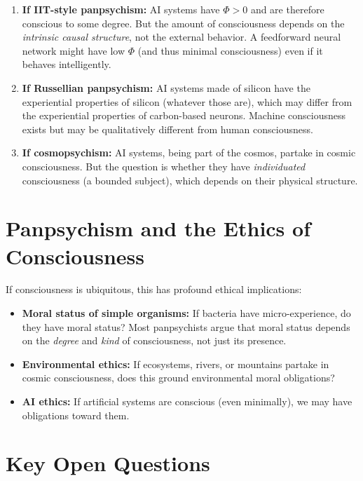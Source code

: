 \documentclass[11pt,a4paper]{report}
\begin{document}
\begin{predbox}
\begin{enumerate}[leftmargin=1.5em]
  \item \textbf{If IIT-style panpsychism:} AI systems have $\Phi > 0$ and are therefore conscious to some degree. But the amount of consciousness depends on the \emph{intrinsic causal structure}, not the external behavior. A feedforward neural network might have low $\Phi$ (and thus minimal consciousness) even if it behaves intelligently.
  \item \textbf{If Russellian panpsychism:} AI systems made of silicon have the experiential properties of silicon (whatever those are), which may differ from the experiential properties of carbon-based neurons. Machine consciousness exists but may be qualitatively different from human consciousness.
  \item \textbf{If cosmopsychism:} AI systems, being part of the cosmos, partake in cosmic consciousness. But the question is whether they have \emph{individuated} consciousness (a bounded subject), which depends on their physical structure.
\end{enumerate}
\end{predbox}

\section{Panpsychism and the Ethics of Consciousness}

If consciousness is ubiquitous, this has profound ethical implications:

\begin{itemize}[leftmargin=1.5em]
  \item \textbf{Moral status of simple organisms:} If bacteria have micro-experience, do they have moral status? Most panpsychists argue that moral status depends on the \emph{degree} and \emph{kind} of consciousness, not just its presence.
  \item \textbf{Environmental ethics:} If ecosystems, rivers, or mountains partake in cosmic consciousness, does this ground environmental moral obligations?
  \item \textbf{AI ethics:} If artificial systems are conscious (even minimally), we may have obligations toward them.
\end{itemize}

\section{Key Open Questions}
\end{document}
